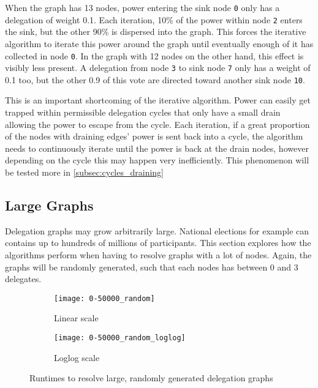 When the graph has 13 nodes, power entering the sink node \texttt{0} only has a delegation of weight 0.1. Each iteration, 10\% of the power within node \texttt{2} enters the sink, but the other 90\% is dispersed into the graph. This forces the iterative algorithm to iterate this power around the graph until eventually enough of it has collected in node \texttt{0}. In the graph with 12 nodes on the other hand, this effect is visibly less present. A delegation from node \texttt{3} to sink node \texttt{7} only has a weight of 0.1 too, but the other 0.9 of this vote are directed toward another sink node \texttt{10}. 

This is an important shortcoming of the iterative algorithm. Power can easily get trapped within permissible delegation cycles that only have a small drain allowing the power to escape from the cycle. Each iteration, if a great proportion of the nodes with draining edges' power is sent back into a cycle, the algorithm needs to continuously iterate until the power is back at the drain nodes, however depending on the cycle this may happen very inefficiently. This phenomenon will be tested more in \cref{subsec:cycles_draining}

\subsection{Large Graphs}

Delegation graphs may grow arbitrarily large. National elections for example can contains up to hundreds of millions of participants. This section explores how the algorithms perform when having to resolve graphs with a lot of nodes. Again, the graphs will be randomly generated, such that each nodes has between 0 and 3 delegates. 

\begin{figure}[t]

\end{figure}

\begin{figure}[t]
    \centering
    \begin{subfigure}[t]{0.45\textwidth}
    	\centering
    	\texttt{[image: 0-50000\_random]}
    	\caption{Linear scale}
    	\label{fig:random-large-linear}
    \end{subfigure}
    \hfill
    \begin{subfigure}[t]{0.45\textwidth}
        \centering
        \texttt{[image: 0-50000\_random\_loglog]}
        \caption{Loglog scale}
         \label{subfig:random-large-loglog}
    \end{subfigure}
    \caption{Runtimes to resolve large, randomly generated delegation graphs}
    \label{fig:random-large}
\end{figure}

